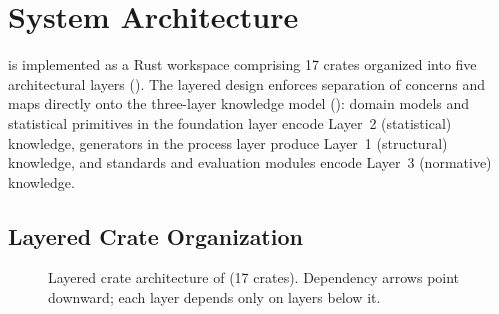 \section{System Architecture}
\label{sec:architecture}

\system{} is implemented as a Rust workspace comprising 17 crates
organized into five architectural layers ().  The
layered design enforces separation of concerns and maps directly onto
the three-layer knowledge model (): domain models
and statistical primitives in the foundation layer encode Layer~2
(statistical) knowledge, generators in the process layer produce Layer~1
(structural) knowledge, and standards and evaluation modules encode
Layer~3 (normative) knowledge.

\subsection{Layered Crate Organization}
\label{sec:arch_layers}

\begin{figure}[t]
\centering
{}
\caption{Layered crate architecture of \system{} (17 crates).
  Dependency arrows point downward; each layer depends only on layers
  below it.}
\label{fig:architecture}
\end{figure}


